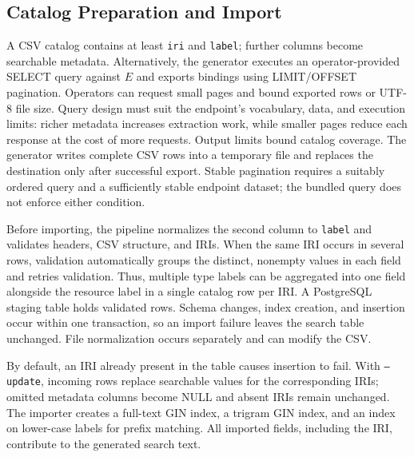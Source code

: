 \subsection{Catalog Preparation and Import}
A CSV catalog contains at least \texttt{iri} and \texttt{label}; further columns become searchable metadata. Alternatively, the generator executes an operator-provided SELECT query against $E$ and exports bindings using LIMIT/OFFSET pagination. Operators can request small pages and bound exported rows or UTF-8 file size. Query design must suit the endpoint's vocabulary, data, and execution limits: richer metadata increases extraction work, while smaller pages reduce each response at the cost of more requests. Output limits bound catalog coverage. The generator writes complete CSV rows into a temporary file and replaces the destination only after successful export. Stable pagination requires a suitably ordered query and a sufficiently stable endpoint dataset; the bundled query does not enforce either condition.

Before importing, the pipeline normalizes the second column to \texttt{label} and validates headers, CSV structure, and IRIs. When the same IRI occurs in several rows, validation automatically groups the distinct, nonempty values in each field and retries validation. Thus, multiple type labels can be aggregated into one field alongside the resource label in a single catalog row per IRI. A PostgreSQL staging table holds validated rows. Schema changes, index creation, and insertion occur within one transaction, so an import failure leaves the search table unchanged. File normalization occurs separately and can modify the CSV.

By default, an IRI already present in the table causes insertion to fail. With \texttt{--update}, incoming rows replace searchable values for the corresponding IRIs; omitted metadata columns become NULL and absent IRIs remain unchanged. The importer creates a full-text GIN index, a trigram GIN index, and an index on lower-case labels for prefix matching. All imported fields, including the IRI, contribute to the generated search text.

